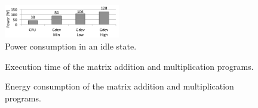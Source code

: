 \begin{figure}[!t]
\centering
 \includegraphics[width=0.45\textwidth]{figures/idol.pdf}
 \caption{Power consumption in an idle state.}
 \label{fig:idle}
\end{figure}

\begin{figure}[!t]
  \centering
  \vspace{-5.0mm}
  \caption{Execution time of the matrix addition and multiplication
 programs.}
  \label{fig:gpu-time}
\end{figure}

\begin{figure}[!t]
  \centering
  \vspace{-5.0mm}
  \caption{Energy consumption of the matrix addition and multiplication
 programs.}
  \label{fig:gpu-energy}
\end{figure}

